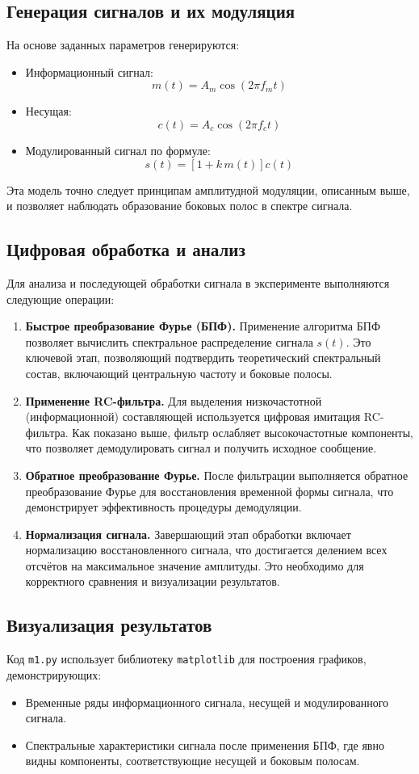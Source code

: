 \documentclass[12pt]{article}
\begin{document}
\subsection{Генерация сигналов и их модуляция}
На основе заданных параметров генерируются:
\begin{itemize}
    \item Информационный сигнал: 
    \[
    m(t) = A_m \cos(2\pi f_m t)
    \]
    \item Несущая: 
    \[
    c(t) = A_c \cos(2\pi f_c t)
    \]
    \item Модулированный сигнал по формуле:
    \[
    s(t) = \left[1 + k\, m(t)\right] c(t)
    \]
\end{itemize}
Эта модель точно следует принципам амплитудной модуляции, описанным выше, и позволяет наблюдать образование боковых полос в спектре сигнала.

\subsection{Цифровая обработка и анализ}
Для анализа и последующей обработки сигнала в эксперименте выполняются следующие операции:
\begin{enumerate}
    \item \textbf{Быстрое преобразование Фурье (БПФ).} Применение алгоритма БПФ позволяет вычислить спектральное распределение сигнала \(s(t)\). Это ключевой этап, позволяющий подтвердить теоретический спектральный состав, включающий центральную частоту и боковые полосы.
    \item \textbf{Применение RC-фильтра.} Для выделения низкочастотной (информационной) составляющей используется цифровая имитация RC-фильтра. Как показано выше, фильтр ослабляет высокочастотные компоненты, что позволяет демодулировать сигнал и получить исходное сообщение.
    \item \textbf{Обратное преобразование Фурье.} После фильтрации выполняется обратное преобразование Фурье для восстановления временной формы сигнала, что демонстрирует эффективность процедуры демодуляции.
    \item \textbf{Нормализация сигнала.} Завершающий этап обработки включает нормализацию восстановленного сигнала, что достигается делением всех отсчётов на максимальное значение амплитуды. Это необходимо для корректного сравнения и визуализации результатов.
\end{enumerate}

\subsection{Визуализация результатов}
Код \texttt{m1.py} использует библиотеку \texttt{matplotlib} для построения графиков, демонстрирующих:
\begin{itemize}
    \item Временные ряды информационного сигнала, несущей и модулированного сигнала.
    \item Спектральные характеристики сигнала после применения БПФ, где явно видны компоненты, соответствующие несущей и боковым полосам.
\end{itemize}
\end{document}

